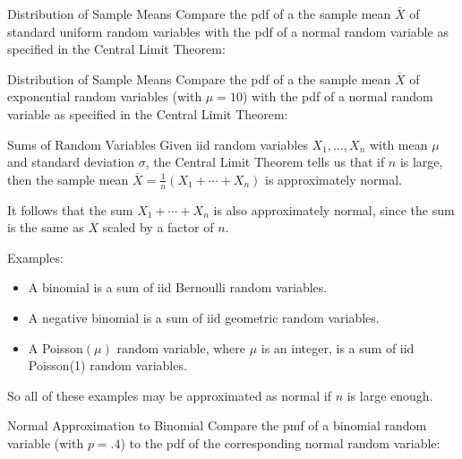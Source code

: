 \documentclass[xcolor=table]{beamer}
\begin{document}
\begin{frame}{Distribution of Sample Means}
Compare the pdf of a the sample mean $\overline{X}$ of standard uniform random variables with the pdf of a normal random variable as specified in the Central Limit Theorem:
\end{frame}

\begin{frame}{Distribution of Sample Means}
Compare the pdf of a the sample mean $\overline{X}$ of exponential random variables (with $\mu=10$) with the pdf of a normal random variable as specified in the Central Limit Theorem:
\end{frame}

\begin{frame}{Sums of Random Variables}
Given iid random variables $X_1,\dots, X_n$  with mean $\mu$ and standard deviation $\sigma$, the Central Limit Theorem tells us that if $n$ is large, then the sample mean $\overline{X}=\frac1n(X_1+\cdots+X_n)$ is approximately normal.

\vspace{.2cm}\pause
It follows that the sum $X_1+\cdots+X_n$ is also approximately normal, since the sum is the same as $\overline{X}$ scaled by a factor of $n$.

\vspace{.2cm}\pause 
Examples:
\begin{itemize}
\pause\item A binomial is a sum of iid Bernoulli random variables.
\pause\item A negative binomial is a sum of iid geometric random variables.
\pause\item A Poisson$(\mu)$ random variable, where $\mu$ is an integer, is a sum of iid Poisson(1) random variables.
\end{itemize}
\pause So all of these examples may be approximated as normal if $n$ is large enough.
\end{frame}

\begin{frame}{Normal Approximation to Binomial}
Compare the pmf of a binomial random variable (with $p=.4$) to the pdf of the corresponding normal random variable:
\end{frame}
\end{document}
